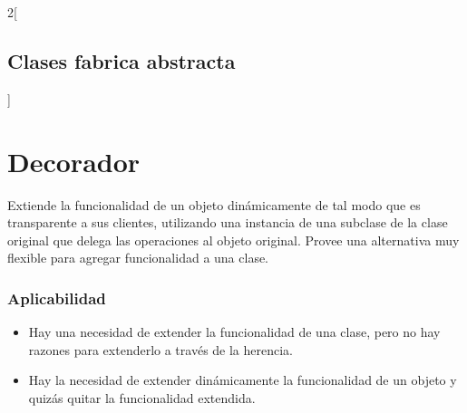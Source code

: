   \begin{multicols}{2}[\subsection{Clases fabrica abstracta}]
    
    
    
    
    
    
    
    
    
    
  \end{multicols}
  
\section{Decorador}
Extiende la funcionalidad de un objeto dinámicamente de tal modo que es transparente a sus clientes, utilizando una instancia de una subclase de la clase original que delega las operaciones al objeto original. Provee una alternativa muy flexible para agregar funcionalidad a una clase. \cite{ref12}

  \subsubsection{Aplicabilidad}
  \begin{itemize}
  	\item Hay una necesidad de extender la funcionalidad de una clase, pero no hay razones para extenderlo a través de la herencia.
  	\item Hay la necesidad de extender dinámicamente la funcionalidad de un objeto y quizás quitar la funcionalidad extendida.
  \end{itemize}

